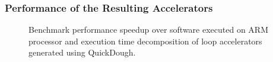 \documentclass[accentcolor=tud1a,colorbacktitle,inverttitle,landscape,german,presentation,t]{tudbeamer}
\begin{document}
  \begin{frame}
  \frametitle{Performance of the Resulting Accelerators}
  \vspace{-1em}
  \begin{figure}
  \centering
  \qquad
  \qquad
  \qquad
  \vspace{-0.8em}
  \caption{Benchmark performance speedup over software executed on ARM processor and execution time 
      decomposition of loop accelerators generated using QuickDough.}
  \label{fig:real-perf}
  \end{figure}  
  \end{frame}
\end{document}
